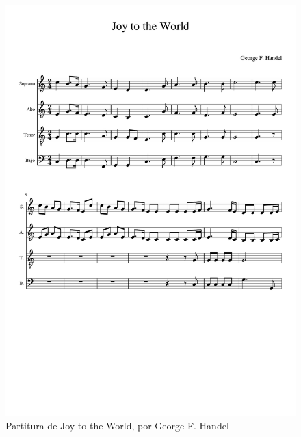     \begin{figure}
    	\centering
    	\includegraphics[width=0.8\linewidth]{imagenes/scores/Joy_to_the_world.pdf}
    	\caption{Partitura de Joy to the World, por George F. Handel}
    	\label{fig:joy_score}
    \end{figure}
 
